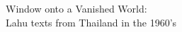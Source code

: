 \chapter*{}
\vspace{10em}
\thispagestyle{empty}
\begin{center}
{\fontsize{36}{36}\selectfont Window onto a Vanished World: \\
Lahu texts from Thailand in the 1960’s}
\end{center}